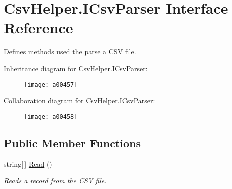 \hypertarget{a00113}{\section{Csv\-Helper.\-I\-Csv\-Parser Interface Reference}
\label{a00113}
}


Defines methods used the parse a C\-S\-V file.  




Inheritance diagram for Csv\-Helper.\-I\-Csv\-Parser\-:
\nopagebreak
\begin{figure}[H]
\begin{center}
\leavevmode
\texttt{[image: a00457]}
\end{center}
\end{figure}


Collaboration diagram for Csv\-Helper.\-I\-Csv\-Parser\-:
\nopagebreak
\begin{figure}[H]
\begin{center}
\leavevmode
\texttt{[image: a00458]}
\end{center}
\end{figure}
\subsection*{Public Member Functions}
\begin{DoxyCompactItemize}
\item 
string\mbox{[}$\,$\mbox{]} \hyperlink{a00113_a411461b4cd33dce0b42c81715359f687}{Read} ()
\begin{DoxyCompactList}\small\item\em Reads a record from the C\-S\-V file. \end{DoxyCompactList}\end{DoxyCompactItemize}
